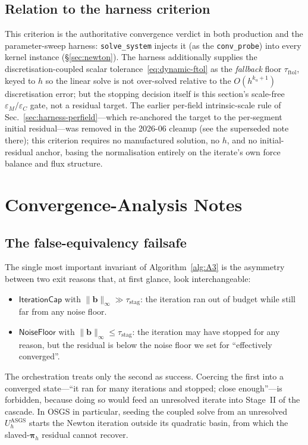 \documentclass{article}
\newcommand{\code}[1]{\texttt{\small #1}}
\newcommand{\textftol}{\tau_{\mathrm{ftol}}}
\newcommand{\textstag}{\tau_{\mathrm{stag}}}
\begin{document}
\subsection{Relation to the harness criterion}
This criterion is the authoritative convergence verdict in both production and the parameter-sweep
harness: \code{solve\_system} injects it (as the \code{conv\_probe}) into every kernel instance
(§\ref{sec:newton}). The harness additionally supplies the discretisation-coupled scalar
tolerance~\eqref{eq:dynamic-ftol} as the \emph{fallback} floor $\textftol$, keyed to $h$ so the linear
solve is not over-solved relative to the $O(h^{k_u+1})$ discretisation error; but the stopping decision
itself is this section's scale-free $\varepsilon_M/\varepsilon_C$ gate, not a residual target.
The earlier per-field intrinsic-scale rule of Sec.~\ref{sec:harness-perfield}---which re-anchored the
target to the per-segment initial residual---was removed in the 2026-06 cleanup (see the superseded
note there); this criterion requires no manufactured solution, no $h$, and no initial-residual anchor,
basing the normalisation entirely on the iterate's own force balance and flux structure.

\section{Convergence-Analysis Notes}
\label{sec:falseEquiv}

\subsection{The false-equivalency failsafe}

The single most important invariant of Algorithm~\ref{alg:A3} is the
asymmetry between two exit reasons that, at first glance, look
interchangeable:
\begin{itemize}
\item $\mathsf{IterationCap}$ with $\|\boldsymbol{b}\|_\infty \gg \textstag$:
the iteration ran out of budget while still far from any noise floor.
\item $\mathsf{NoiseFloor}$ with $\|\boldsymbol{b}\|_\infty \le \textstag$:
the iteration may have stopped for any reason, but the residual is below
the noise floor we set for ``effectively converged''.
\end{itemize}
The orchestration treats only the second as success. Coercing the
first into a converged state---``it ran for many iterations and
stopped; close enough''---is forbidden, because doing so would feed an
unresolved iterate into Stage~II of the cascade. In OSGS in particular,
seeding the coupled solve from an unresolved $U_h^{\mathrm{ASGS}}$
starts the Newton iteration outside its quadratic basin, from which the
slaved-$\boldsymbol{\pi}_h$ residual cannot recover.
\end{document}
